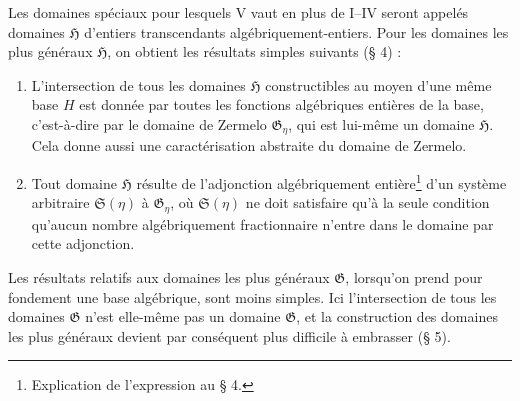 Les domaines spéciaux pour lesquels V vaut en plus de I--IV seront appelés domaines $\mathfrak H$ d'entiers transcendants algébriquement-entiers. Pour les domaines les plus généraux $\mathfrak H$, on obtient les résultats simples suivants (\S{} 4) :
\begin{enumerate}
\item[a)] L'intersection de tous les domaines $\mathfrak H$ constructibles au moyen d'une même base $H$ est donnée par toutes les fonctions algébriques entières de la base, c'est-à-dire par le domaine de Zermelo $\mathfrak G_\eta$, qui est lui-même un domaine $\mathfrak H$. Cela donne aussi une caractérisation abstraite du domaine de Zermelo.
\item[b)] Tout domaine $\mathfrak H$ résulte de l'adjonction algébriquement entière\footnote{Explication de l'expression au \S{} 4.} d'un système arbitraire $\mathfrak S(\eta)$ à $\mathfrak G_\eta$, où $\mathfrak S(\eta)$ ne doit satisfaire qu'à la seule condition qu'aucun nombre algébriquement fractionnaire n'entre dans le domaine par cette adjonction.
\end{enumerate}

Les résultats relatifs aux domaines les plus généraux $\mathfrak G$, lorsqu'on prend pour fondement une base algébrique, sont moins simples. Ici l'intersection de tous les domaines $\mathfrak G$ n'est elle-même pas un domaine $\mathfrak G$, et la construction des domaines les plus généraux devient par conséquent plus difficile à embrasser (\S{} 5).

